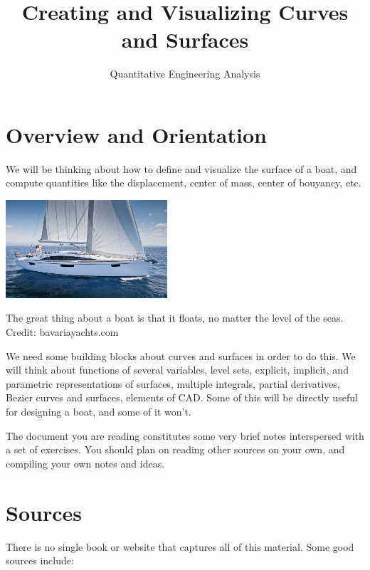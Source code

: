 \documentclass{tufte-handout}
\title{Creating and Visualizing Curves and Surfaces}
\author{Quantitative Engineering Analysis}
\date{}
\begin{document}
\maketitle
\thispagestyle{firstpage}

\begin{abstract}
\end{abstract}

\section{Overview and Orientation}
We will be thinking about how to define and visualize the surface of a boat, and compute quantities like the displacement, center of mass, center of bouyancy, etc.

\begin{marginfigure}
\includegraphics[width=6cm]{figs/bavaria_yacht}
\caption{The great thing about a boat is that it floats, no matter the level of the seas. Credit: bavariayachts.com}
\end{marginfigure}

We need some building blocks about curves and surfaces in order to do this. We will think about functions of several variables, level sets, explicit, implicit, and parametric representations of surfaces, multiple integrals, partial derivatives, Bezier curves and surfaces, elements of CAD.  Some of this will be directly useful for designing a boat, and some of it won't.

The document you are reading constitutes some very brief notes interspersed with a set of exercises. You should plan on reading other sources on your own, and compiling your own notes and ideas. 

\section{Sources}

There is no single book or website that captures all of this material. Some good sources include:
\end{document}
